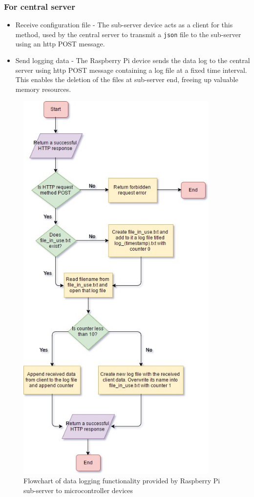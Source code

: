 \documentclass[letterpaper,11pt]{report}
\begin{document}
\subsubsection{For central server}
\begin{itemize}
    \item Receive configuration file - The sub-server device acts as a client for this method, used by the central server to transmit a \verb|json| file to the sub-server using an \ac{http} POST message.
    \item Send logging data - The Raspberry Pi device sends the data log to the central server using \ac{http} POST message containing a log file at a fixed time interval. This enables the deletion of the files at sub-server end, freeing up valuable memory resources.
\end{itemize}
\begin{figure}[ht]
\includegraphics[width=10cm, height=20.2cm]{test}
\centering
\captionsetup{justification=centering}
\caption{Flowchart of data logging functionality provided by Raspberry Pi sub-server to microcontroller devices}
\label{fig:flow}
\end{figure}
\end{document}
